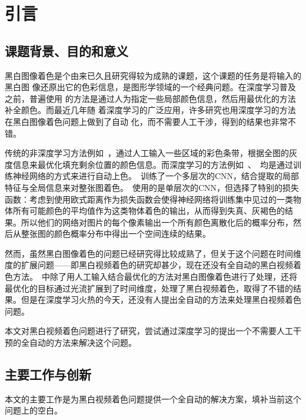 \chapter{引言}
\label{cha:1-intro}

\section{课题背景、目的和意义}
\label{sec:1-intro}

  黑白图像着色是个由来已久且研究得较为成熟的课题，这个课题的任务是将输入的黑白图
  像还原出它的色彩信息，是图形学领域的一个经典问题。在深度学习普及之前，普遍使用
  的方法是通过人为指定一些局部颜色信息，然后用最优化的方法补全颜色。而最近几年随
  着深度学习的广泛应用，许多研究也用深度学习的方法在黑白图像着色问题上做到了自动
  化，而不需要人工干涉，得到的结果也非常不错。

  传统的非深度学习方法例如~，通过人工输入一些区域的彩色条带，根据全图的灰度信息来最优化填充剩余位置的颜色信息。而深度学习的方法例如~、~均是通过训练神经网络的方式来进行自动上色。~训练了一个多层次的CNN，结合提取的局部特征与全局信息来对整张图着色。~使用的是单层次的CNN，但选择了特别的损失函数：考虑到使用欧式距离作为损失函数会使得神经网络将训练集中见过的一类物体所有可能颜色的平均值作为这类物体着色的输出，从而得到失真、灰褐色的结果。所以他们的网络对图片的每个像素输出一个所有颜色离散化后的概率分布，然后从整张图的颜色概率分布中得出一个空间连续的结果。

  然而，虽然黑白图像着色的问题已经研究得比较成熟了，但关于这个问题在时间维度的扩展问题——即黑白视频着色的研究却甚少，现在还没有全自动的黑白视频着色方法。~中除了用人工输入结合最优化的方法对黑白图像着色进行了处理，还将最优化的目标通过光流扩展到了时间维度，处理了黑白视频着色，取得了不错的结果。但是在深度学习火热的今天，还没有人提出全自动的方法来处理黑白视频着色问题。

  本文对黑白视频着色问题进行了研究，尝试通过深度学习的提出一个不需要人工干预的全自动的方法来解决这个问题。

\section{主要工作与创新}
\label{sec:1-works}

  本文的主要工作是为黑白视频着色问题提供一个全自动的解决方案，填补当前这个问题上的空白。

